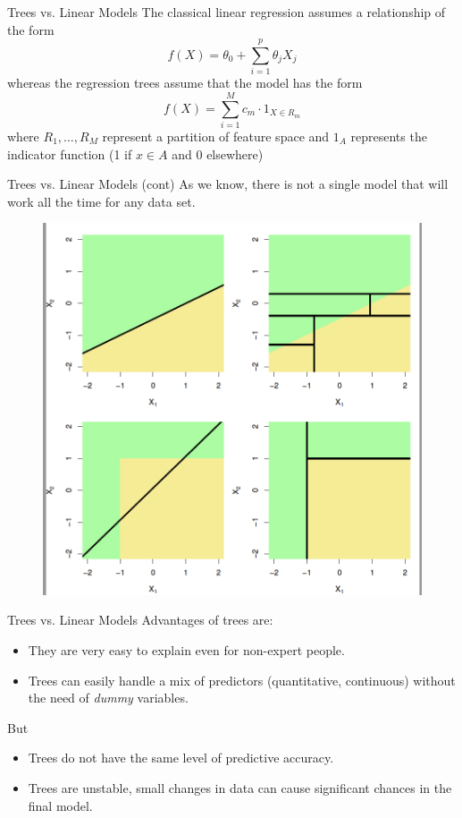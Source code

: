 \documentclass{beamer}
\begin{document}
\begin{frame}{Trees vs. Linear Models}
	The classical linear regression assumes a relationship of the form
	\begin{equation*}
		f(X)= \theta_0 + \sum_{i=1}^p \theta_j X_j
	\end{equation*}
whereas the regression trees assume that the model has the form
\begin{equation*}
	f(X)=\sum_{i=1}^M c_m \cdot 1_{X \in R_m}
\end{equation*}
where $R_1,\ldots,R_M$ represent a partition of feature space and $1_A$ represents the indicator function (1 if $x\in A$ and 0 elsewhere)
\end{frame}

\begin{frame}{Trees vs. Linear Models (cont)}
	As we know, there is not a single model that will work all the time for any data set. 
	\begin{figure}[h]
	\centering
	\includegraphics[scale=0.4]{../../Figures/fig_trees_vs_ols.png}
\end{figure}	
\end{frame}

\begin{frame}{Trees vs. Linear Models}
	Advantages of trees are:
	\begin{itemize}
		\item They are very easy to explain even for non-expert people.
		\item Trees can easily handle a mix of predictors (quantitative, continuous) without the need of {\it dummy} variables.
	\end{itemize}
But 
\begin{itemize}
	\item Trees do not have the same level of predictive accuracy.
	\item Trees are unstable, small changes in data can cause significant chances in the final model.
\end{itemize}
\end{frame}
\end{document}
